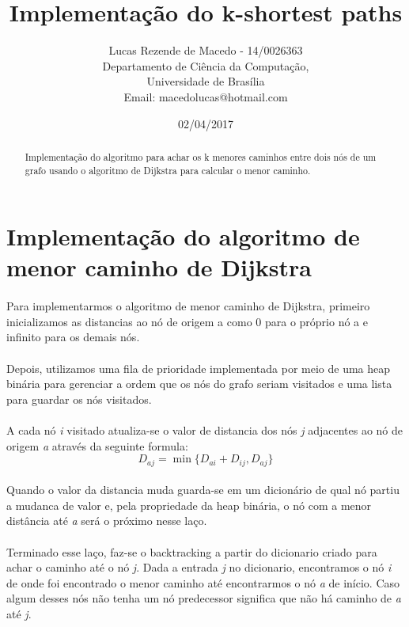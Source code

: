 \documentclass[a4paper,10pt]{article}
\title{Implementação do k-shortest paths}
\author{
Lucas Rezende de Macedo - 14/0026363 \\
Departamento de Ciência da Computação, \\ Universidade de Brasília\\
Email: macedolucas@hotmail.com
}
\date{02/04/2017}
\begin{document}
\maketitle

\begin{abstract}
  Implementação do algoritmo para achar os k menores caminhos entre dois nós de 
um grafo usando o algoritmo de Dijkstra para calcular o menor caminho.
\end{abstract}

\section{Implementação do algoritmo de menor caminho de Dijkstra}

  \paragraph{}Para implementarmos o algoritmo de menor caminho de Dijkstra, primeiro inicializamos 
as distancias ao nó de origem a como 0 para o próprio nó a e infinito para os demais nós.
  
  \paragraph{}Depois, utilizamos uma fila de prioridade implementada por meio de uma 
heap binária para gerenciar a ordem que os nós do grafo seriam visitados e uma lista para guardar os 
nós visitados.
  
  \paragraph{}A cada nó \emph{i} visitado atualiza-se o valor de distancia dos nós \emph{j} 
adjacentes ao nó de origem \emph{a} através da seguinte formula:
  \begin{equation}
   D_{aj} = \min \{D_{ai} + D_{ij}, D_{aj}\}
  \end{equation}

  \paragraph{}Quando o valor da distancia muda guarda-se em um dicionário de qual nó partiu a 
mudanca de valor e, pela propriedade da heap binária, o nó com a menor distância até \emph{a} será 
o próximo nesse laço.

  \paragraph{}Terminado esse laço, faz-se o backtracking a partir do dicionario criado para achar o 
caminho até o nó \emph{j}. Dada a entrada \emph{j} no dicionario, encontramos o nó \emph{i} de onde 
foi encontrado o menor caminho até encontrarmos o nó \emph{a} de início. Caso algum desses nós não 
tenha um nó predecessor significa que não há caminho de \emph{a} até \emph{j}.
\end{document}
